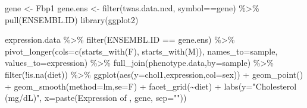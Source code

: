 \documentclass[
]{article}
\newenvironment{Shaded}{\begin{snugshade}}{\end{snugshade}}
\newcommand{\AttributeTok}[1]{\textcolor[rgb]{0.77,0.63,0.00}{#1}}
\newcommand{\FunctionTok}[1]{\textcolor[rgb]{0.00,0.00,0.00}{#1}}
\newcommand{\NormalTok}[1]{#1}
\newcommand{\OtherTok}[1]{\textcolor[rgb]{0.56,0.35,0.01}{#1}}
\newcommand{\SpecialCharTok}[1]{\textcolor[rgb]{0.00,0.00,0.00}{#1}}
\newcommand{\StringTok}[1]{\textcolor[rgb]{0.31,0.60,0.02}{#1}}
\begin{document}
\begin{Shaded}
\begin{Highlighting}[]
\NormalTok{gene }\OtherTok{\textless{}{-}} \StringTok{\textquotesingle{}Fbp1\textquotesingle{}}
\NormalTok{gene.ens }\OtherTok{\textless{}{-}} \FunctionTok{filter}\NormalTok{(twas.data.ncd, symbol}\SpecialCharTok{==}\NormalTok{gene) }\SpecialCharTok{\%\textgreater{}\%} \FunctionTok{pull}\NormalTok{(ENSEMBL.ID)}
\FunctionTok{library}\NormalTok{(ggplot2)}

\NormalTok{expression.data }\SpecialCharTok{\%\textgreater{}\%}
  \FunctionTok{filter}\NormalTok{(ENSEMBL.ID }\SpecialCharTok{==}\NormalTok{ gene.ens) }\SpecialCharTok{\%\textgreater{}\%}
  \FunctionTok{pivot\_longer}\NormalTok{(}\AttributeTok{cols=}\FunctionTok{c}\NormalTok{(}\FunctionTok{starts\_with}\NormalTok{(}\StringTok{\textquotesingle{}F\textquotesingle{}}\NormalTok{),}
                      \FunctionTok{starts\_with}\NormalTok{(}\StringTok{\textquotesingle{}M\textquotesingle{}}\NormalTok{)),}
               \AttributeTok{names\_to=}\StringTok{\textquotesingle{}sample\textquotesingle{}}\NormalTok{,}
               \AttributeTok{values\_to=}\StringTok{\textquotesingle{}expression\textquotesingle{}}\NormalTok{) }\SpecialCharTok{\%\textgreater{}\%}
  \FunctionTok{full\_join}\NormalTok{(phenotype.data,}\AttributeTok{by=}\StringTok{\textquotesingle{}sample\textquotesingle{}}\NormalTok{) }\SpecialCharTok{\%\textgreater{}\%}
  \FunctionTok{filter}\NormalTok{(}\SpecialCharTok{!}\FunctionTok{is.na}\NormalTok{(diet)) }\SpecialCharTok{\%\textgreater{}\%}
  \FunctionTok{ggplot}\NormalTok{(}\FunctionTok{aes}\NormalTok{(}\AttributeTok{y=}\NormalTok{chol1,expression,}\AttributeTok{col=}\NormalTok{sex)) }\SpecialCharTok{+}
  \FunctionTok{geom\_point}\NormalTok{() }\SpecialCharTok{+}
  \FunctionTok{geom\_smooth}\NormalTok{(}\AttributeTok{method=}\StringTok{\textquotesingle{}lm\textquotesingle{}}\NormalTok{,}\AttributeTok{se=}\NormalTok{F) }\SpecialCharTok{+}
  \FunctionTok{facet\_grid}\NormalTok{(}\SpecialCharTok{\textasciitilde{}}\NormalTok{diet) }\SpecialCharTok{+}
  \FunctionTok{labs}\NormalTok{(}\AttributeTok{y=}\StringTok{"Cholesterol (mg/dL)"}\NormalTok{,}
       \AttributeTok{x=}\FunctionTok{paste}\NormalTok{(}\StringTok{\textquotesingle{}Expression of \textquotesingle{}}\NormalTok{, gene, }\AttributeTok{sep=}\StringTok{""}\NormalTok{))}
\end{Highlighting}
\end{Shaded}
\end{document}
